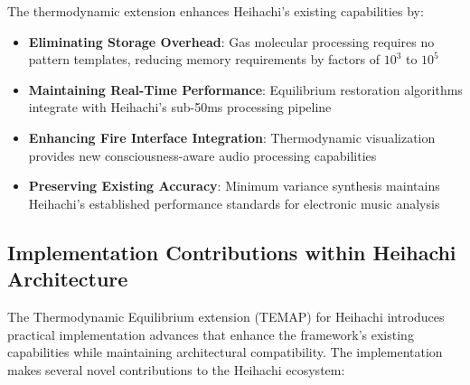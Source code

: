 \documentclass[12pt,a4paper]{article}
\begin{document}
The thermodynamic extension enhances Heihachi's existing capabilities by:
\begin{itemize}
\item \textbf{Eliminating Storage Overhead}: Gas molecular processing requires no pattern templates, reducing memory requirements by factors of $10^3$ to $10^5$
\item \textbf{Maintaining Real-Time Performance}: Equilibrium restoration algorithms integrate with Heihachi's sub-50ms processing pipeline
\item \textbf{Enhancing Fire Interface Integration}: Thermodynamic visualization provides new consciousness-aware audio processing capabilities
\item \textbf{Preserving Existing Accuracy}: Minimum variance synthesis maintains Heihachi's established performance standards for electronic music analysis
\end{itemize}

\subsection{Implementation Contributions within Heihachi Architecture}

The Thermodynamic Equilibrium extension (TEMAP) for Heihachi introduces practical implementation advances that enhance the framework's existing capabilities while maintaining architectural compatibility. The implementation makes several novel contributions to the Heihachi ecosystem:
\end{document}
